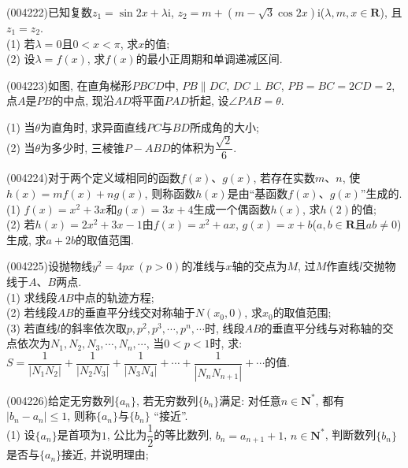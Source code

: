 \item (004222)已知复数$z_1=\sin 2x+\lambda \mathrm{i}$, $z_2=m+(m-\sqrt 3\cos 2x)\mathrm{i}$($\lambda ,m,x\in \mathbf{R}$), 且$z_1=z_2$.\\
(1) 若$\lambda =0$且$0<x<\pi$, 求$x$的值;\\
(2) 设$\lambda =f(x)$, 求$f(x)$的最小正周期和单调递减区间.
\item (004223)如图, 在直角梯形$PBCD$中, $PB\parallel DC$, $DC\perp BC$, $PB=BC=2CD=2$, 点$A$是$PB$的中点, 现沿$AD$将平面$PAD$折起, 设$\angle PAB=\theta$.
\begin{center}
\end{center}
(1) 当$\theta$为直角时, 求异面直线$PC$与$BD$所成角的大小;\\
(2) 当$\theta$为多少时, 三棱锥$P-ABD$的体积为$\dfrac{\sqrt 2}6$.
\item (004224)对于两个定义域相同的函数$f(x)$、$g(x)$, 若存在实数$m$、$n$, 使$h(x)=mf(x)+ng(x)$, 则称函数$h(x)$是由``基函数$f(x)$、$g(x)$''生成的.\\
(1) $f(x)=x^2+3x$和$g(x)=3x+4$生成一个偶函数$h(x)$, 求$h(2)$的值;\\
(2) 若$h(x)=2x^2+3x-1$由$f(x)=x^2+ax$, $g(x)=x+b$($a,b\in \mathbf{R}$且$ab\ne 0$)生成, 求$a+2b$的取值范围.
\item (004225)设抛物线$y^2=4px\ (p>0)$的准线与$x$轴的交点为$M$, 过$M$作直线$l$交抛物线于$A$、$B$两点.\\
(1) 求线段$AB$中点的轨迹方程;\\
(2) 若线段$AB$的垂直平分线交对称轴于$N(x_0,0)$, 求$x_0$的取值范围;\\
(3) 若直线$l$的斜率依次取$p, p^2,p^3,\cdots ,p^n,\cdots$时, 线段$AB$的垂直平分线与对称轴的交点依次为$N_1, N_2, N_3,\cdots ,N_n, \cdots$, 当$0<p<1$时, 求: $S=\dfrac 1{|N_1N_2|}+\dfrac 1{|N_2N_3|}+\dfrac 1{|N_3N_4|}+\cdots +\dfrac 1{|N_nN_{n+1}|}+\cdots$的值.
\item (004226)给定无穷数列$\{a_n\}$, 若无穷数列$\{b_n\}$满足: 对任意$n\in \mathbf{N}^*$, 都有$|b_n-a_n|\le 1$, 则称$\{a_n\}$与$\{b_n\}$ ``接近''.\\
(1) 设$\{a_n\}$是首项为$1$, 公比为$\dfrac 12$的等比数列, $b_n=a_{n+1}+1$, $n\in \mathbf{N}^*$, 判断数列$\{b_n\}$是否与$\{a_n\}$接近, 并说明理由;\\
